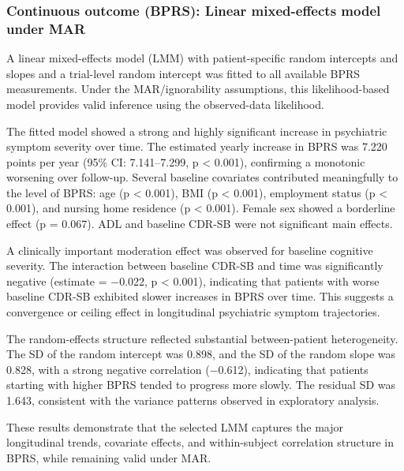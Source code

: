 \documentclass[
  9pt,
  letterpaper,
  DIV=11,
  numbers=noendperiod]{scrartcl}
\begin{document}
\subsubsection{Continuous outcome (BPRS): Linear mixed-effects model
under
MAR}\label{continuous-outcome-bprs-linear-mixed-effects-model-under-mar}

A linear mixed-effects model (LMM) with patient-specific random
intercepts and slopes and a trial-level random intercept was fitted to
all available BPRS measurements. Under the MAR/ignorability assumptions,
this likelihood-based model provides valid inference using the
observed-data likelihood.

The fitted model showed a strong and highly significant increase in
psychiatric symptom severity over time. The estimated yearly increase in
BPRS was 7.220 points per year (95\% CI: 7.141--7.299, p \textless{}
0.001), confirming a monotonic worsening over follow-up. Several
baseline covariates contributed meaningfully to the level of BPRS: age
(p \textless{} 0.001), BMI (p \textless{} 0.001), employment status (p
\textless{} 0.001), and nursing home residence (p \textless{} 0.001).
Female sex showed a borderline effect (p = 0.067). ADL and baseline
CDR-SB were not significant main effects.

A clinically important moderation effect was observed for baseline
cognitive severity. The interaction between baseline CDR-SB and time was
significantly negative (estimate = −0.022, p \textless{} 0.001),
indicating that patients with worse baseline CDR-SB exhibited slower
increases in BPRS over time. This suggests a convergence or ceiling
effect in longitudinal psychiatric symptom trajectories.

The random-effects structure reflected substantial between-patient
heterogeneity. The SD of the random intercept was 0.898, and the SD of
the random slope was 0.828, with a strong negative correlation (−0.612),
indicating that patients starting with higher BPRS tended to progress
more slowly. The residual SD was 1.643, consistent with the variance
patterns observed in exploratory analysis.

These results demonstrate that the selected LMM captures the major
longitudinal trends, covariate effects, and within-subject correlation
structure in BPRS, while remaining valid under MAR.

\begingroup\fontsize{9}{11}\selectfont
\end{document}
